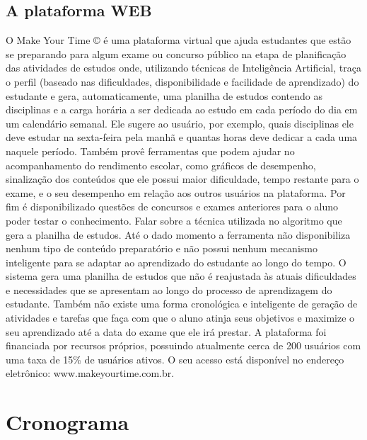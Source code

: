 \documentclass[
12pt,				%
oneside,			%
a4paper,			%
english,			%
brazil				%
]{abntex2ppgsi}
\begin{document}
\section{A plataforma WEB}

O Make Your Time © é uma plataforma virtual que ajuda estudantes que estão se preparando para algum exame ou concurso público na etapa de planificação das atividades de estudos onde, utilizando técnicas de Inteligência Artificial, traça o perfil (baseado nas dificuldades, disponibilidade e facilidade de aprendizado) do estudante e gera, automaticamente, uma planilha de estudos contendo as disciplinas e a carga horária a ser dedicada ao estudo em cada período do dia em um calendário semanal. Ele sugere ao usuário, por exemplo, quais disciplinas ele deve estudar na sexta-feira pela manhã e quantas horas deve dedicar a cada uma naquele período. Também provê ferramentas que podem ajudar no acompanhamento do rendimento escolar, como gráficos de desempenho, sinalização dos conteúdos que ele possui maior dificuldade, tempo restante para o exame, e o seu desempenho em relação aos outros usuários na plataforma. Por fim é disponibilizado questões de concursos e exames anteriores para o aluno poder testar o conhecimento.
Falar sobre a técnica utilizada no algoritmo que gera a planilha de estudos.
Até o dado momento a ferramenta não disponibiliza nenhum tipo de conteúdo preparatório e não possui nenhum mecanismo inteligente para se adaptar ao aprendizado do estudante ao longo do tempo. O sistema gera uma planilha de estudos que não é reajustada às atuais dificuldades e necessidades que se apresentam ao longo do processo de aprendizagem do estudante. Também não existe uma forma cronológica e inteligente de geração de atividades e tarefas que faça com que o aluno atinja seus objetivos e maximize o seu aprendizado até a data do exame que ele irá prestar.
A plataforma foi financiada por recursos próprios, possuindo atualmente cerca de 200 usuários com uma taxa de 15\% de usuários ativos. O seu acesso está disponível no endereço eletrônico: www.makeyourtime.com.br. 

\chapter{Cronograma}


\postextual




\end{document}
